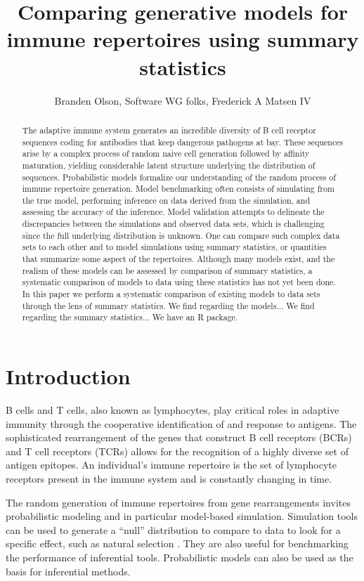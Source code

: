 \documentclass{article}
\title{Comparing generative models for immune repertoires using summary statistics}
\author{Branden Olson, Software WG folks, Frederick A Matsen IV}
\begin{document}
\maketitle

\begin{abstract}
The adaptive immune system generates an incredible diversity of B cell receptor sequences coding for antibodies that keep dangerous pathogens at bay.
These sequences arise by a complex process of random naive cell generation followed by affinity maturation, yielding considerable latent structure underlying the distribution of sequences.
Probabilistic models formalize our understanding of the random process of immune repertoire generation.
Model benchmarking often consists of simulating from the true model, performing inference on data derived from the simulation, and assessing the accuracy of the inference.
Model validation attempts to delineate the discrepancies between the simulations and observed data sets, which is challenging since the full underlying distribution is unknown.
One can compare such complex data sets to each other and to model simulations using summary statistics, or quantities that summarize some aspect of the repertoires.
Although many models exist, and the realism of these models can be assessed by comparison of summary statistics, a systematic comparison of models to data using these statistics has not yet been done.
In this paper we perform a systematic comparison of existing models to data sets through the lens of summary statistics.
We find regarding the models...
We find regarding the summary statistics...
We have an R package.
\end{abstract}

\section*{Introduction}

B cells and T cells, also known as lymphocytes, play critical roles in adaptive immunity through the cooperative identification of and response to antigens.
The sophisticated rearrangement of the genes that construct B cell receptors (BCRs) and T cell receptors (TCRs) allows for the recognition of a highly diverse set of antigen epitopes.
An individual's immune repertoire is the set of lymphocyte receptors present in the immune system and is constantly changing in time.

The random generation of immune repertoires from gene rearrangements invites probabilistic modeling and in particular model-based simulation.
Simulation tools can be used to generate a ``null'' distribution to compare to data to look for a specific effect, such as natural selection \cite{Yaari2012-kk}.
They are also useful for benchmarking the performance of inferential tools.
Probabilistic models can also be used as the basis for inferential methods.
\end{document}
